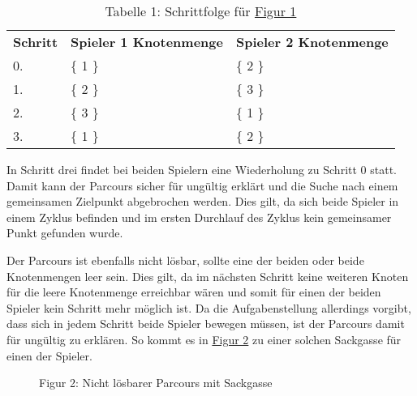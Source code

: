 \documentclass[a4paper,10pt,ngerman]{scrartcl}
\begin{document}
    \begin{table}
        \centering
        \begin{tabular}{lll}
            \textbf{Schritt} & \textbf{Spieler 1 Knotenmenge} & \textbf{Spieler 2 Knotenmenge} \\
            0.               & \{ 1 \}                        & \{ 2 \}                        \\
            1.               & \{ 2 \}                        & \{ 3 \}                        \\
            2.               & \{ 3 \}                        & \{ 1 \}                        \\
            3.               & \{ 1 \}                        & \{ 2 \}                        \\
        \end{tabular}
        \caption{Tabelle 1: Schrittfolge für \hyperref[fig:Figure1]{Figur 1}}
        \label{tab:Table1}
    \end{table}

    In Schritt drei findet bei beiden Spielern eine Wiederholung zu Schritt 0 statt.
    Damit kann der Parcours sicher für ungültig erklärt
    und die Suche nach einem gemeinsamen Zielpunkt abgebrochen werden.
    Dies gilt, da sich beide Spieler in einem Zyklus befinden
    und im ersten Durchlauf des Zyklus kein gemeinsamer Punkt gefunden wurde.

    Der Parcours ist ebenfalls nicht lösbar, sollte eine der beiden oder beide Knotenmengen leer sein.
    Dies gilt, da im nächsten Schritt keine weiteren Knoten für die leere Knotenmenge erreichbar wären
    und somit für einen der beiden Spieler kein Schritt mehr möglich ist.
    Da die Aufgabenstellung allerdings vorgibt, dass sich in jedem Schritt beide Spieler bewegen müssen,
    ist der Parcours damit für ungültig zu erklären.
    So kommt es in \hyperref[fig:Figure2]{Figur 2} zu einer solchen Sackgasse für einen der Spieler.

    \begin{figure}[!h]
        \centering
        \FigurZwei{}
        \caption{Figur 2: Nicht lösbarer Parcours mit Sackgasse}
        \label{fig:Figure2}
    \end{figure}
\end{document}
